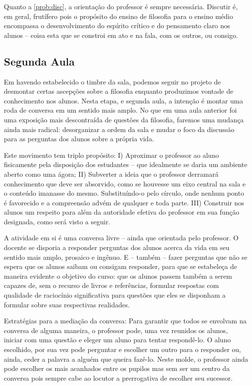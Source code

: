 \documentclass[12pt,a4paper]{article}
\begin{document}
	Quanto a \ref{prob:disc}, a orientação do professor é sempre
	necessária. Discutir é, em geral, frutífero pois o propósito
	do ensino de filosofia para o ensino médio encompassa o 
	desenvolvimento do espírito crítico e do pensamento claro nos 
	alunos -- coisa esta que se constroi em ato e na fala, com os 
	outros, ou consigo.

	\subsection*{Segunda Aula}

	Em havendo estabelecido o timbre da sala, podemos seguir no 
	projeto de desmontar certas ascepções sobre a filosofia 
	enquanto produzimos vontade de conhecimento nos alunos. Nesta
	etapa, e segunda aula, a intenção é montar uma roda de conversa
	em um sentido mais amplo. No que em uma aula anterior foi uma 
	exposição mais descontraída de questões da filosofia, faremos 
	uma mudança ainda mais radical: desorganizar a ordem da sala e 
	mudar o foco da discussão para as perguntas dos alunos sobre 
	a própria vida. 

	Este movimento tem triplo propósito: I) Aproximar o 
	professor ao aluno fisicamente pela disposição dos 
	estudantes -- que idealmente se daria um ambiente aberto como 
	uma ágora; II) Subverter a ideia que o professor 
	derramará conhecimento que deve ser absorvido, como se houvesse
	um eixo central na sala e o conteúdo imanasse do mesmo. 
	Substituíndo-o pelo círculo, onde nenhum ponto é favorecido e 
	a compreensão advém de qualquer e toda parte. III) 
	Construir nos alunos um respeito para além da autoridade efetiva
	do professor em sua função designada, como será visto a seguir.

	A atividade em si é uma conversa livre -- ainda que orientada 
	pelo professor. O docente se disporia a responder perguntas dos 
	alunos acerca da vida em seu sentido mais amplo, prosaico e 
	ingênuo. E -- também -- fazer perguntas que não se espera que 
	os alunos saibam ou consigam responder, para que se estabeleça 
	de maneira evidente o objetivo do curso: que os alunos passem 
	também a serem capazes de, sem o recurso de livros e referências,
	formular respostas com qualidade de raciocínio significativa 
	para questões que eles se disponham a formular sobre suas 
	respectivas realidades.
	
	Estratégias para a mediação da conversa: Para garantir que todos 
	se envolvam na conversa de alguma maneira, o professor pode, uma 
	vez reunidos os alunos, iniciar com uma questão e eleger um aluno 
	para tentar respondê-lo. O aluno escolhido, por sua vez pode 
	perguntar e escolher um outro para o responder ou, ainda, ceder a 
	palavra a alguém que queira fazê-lo. Neste molde, o professor 
	ainda pode escolher os mais acanhados entre os pupilos mas sem 
	ser um centro da conversa pois sempre cabe ao locutor a 
	prerrogativa de escolher seu sucessor.
	
\end{document}
